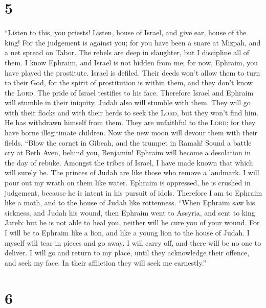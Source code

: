 \hypertarget{section-4}{%
\section{5}\label{section-4}}

 ``Listen to this, you priests! Listen, house of Israel,
and give ear, house of the king! For the judgement is against you; for
you have been a snare at Mizpah, and a net spread on Tabor.
 The rebels are deep in slaughter, but I discipline all of
them.  I know Ephraim, and Israel is not hidden from me;
for now, Ephraim, you have played the prostitute. Israel is defiled.
 Their deeds won't allow them to turn to their God, for
the spirit of prostitution is within them, and they don't know the
\textsc{Lord}.  The pride of Israel testifies to his face.
Therefore Israel and Ephraim will stumble in their iniquity. Judah also
will stumble with them.  They will go with their flocks
and with their herds to seek the \textsc{Lord}, but they won't find him.
He has withdrawn himself from them.  They are unfaithful
to the \textsc{Lord}; for they have borne illegitimate children. Now the
new moon will devour them with their fields.  ``Blow the
cornet in Gibeah, and the trumpet in Ramah! Sound a battle cry at Beth
Aven, behind you, Benjamin!  Ephraim will become a
desolation in the day of rebuke. Amongst the tribes of Israel, I have
made known that which will surely be.  The princes of
Judah are like those who remove a landmark. I will pour out my wrath on
them like water.  Ephraim is oppressed, he is crushed in
judgement, because he is intent in his pursuit of idols. 
Therefore I am to Ephraim like a moth, and to the house of Judah like
rottenness.  ``When Ephraim saw his sickness, and Judah
his wound, then Ephraim went to Assyria, and sent to king Jareb: but he
is not able to heal you, neither will he cure you of your wound.
 For I will be to Ephraim like a lion, and like a young
lion to the house of Judah. I myself will tear in pieces and go away. I
will carry off, and there will be no one to deliver.  I
will go and return to my place, until they acknowledge their offence,
and seek my face. In their affliction they will seek me earnestly.''

\hypertarget{section-5}{%
\section{6}\label{section-5}}

